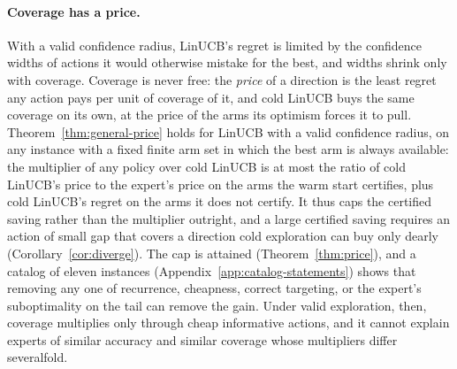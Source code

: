 \documentclass[anon]{alt2027} %
\begin{document}
\paragraph{Coverage has a price.}
With a valid confidence radius, LinUCB's regret is limited by the confidence
widths of actions it would otherwise mistake for the best, and widths shrink
only with coverage. Coverage is never free: the \emph{price} of a direction is
the least regret any action pays per unit of coverage of it, and cold LinUCB
buys the same coverage on its own, at the price of the arms its optimism
forces it to pull. Theorem~\ref{thm:general-price} holds for LinUCB with a
valid confidence radius, on any instance with a fixed finite arm set in which
the best arm is always available: the multiplier of any policy over cold
LinUCB is at most the ratio of cold LinUCB's price to the expert's price on
the arms the warm start certifies, plus cold LinUCB's regret on the arms it
does not certify. It thus caps the certified saving rather than the
multiplier outright, and a large certified saving requires an action of small
gap that covers a direction cold exploration can buy only dearly
(Corollary~\ref{cor:diverge}). The cap is attained (Theorem~\ref{thm:price}),
and a catalog of eleven instances (Appendix~\ref{app:catalog-statements})
shows that removing any one of recurrence, cheapness, correct targeting, or
the expert's suboptimality on the tail can remove the gain. Under valid
exploration, then, coverage multiplies only through cheap informative
actions, and it cannot explain experts of similar accuracy and similar
coverage whose multipliers differ severalfold.
\end{document}
